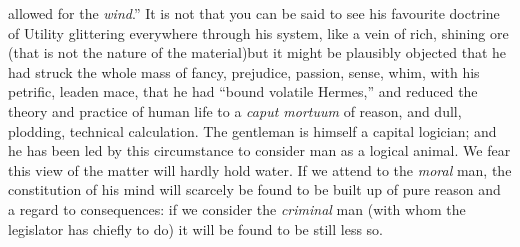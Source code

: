 allowed for the \emph{wind}.'' It is not that you can be said to
see his favourite doctrine of Utility glittering everywhere
through his system, like a vein of rich, shining ore (that is not
the nature of the material)\textemdash but it might be plausibly
objected that he had struck the whole mass of fancy, prejudice,
passion, sense, whim, with his petrific, leaden mace, that he had
``bound volatile Hermes,'' and reduced the theory and practice of
human life to a \emph{caput mortuum} of reason, and dull,
plodding, technical calculation. The gentleman is himself a
capital logician; and he has been led by this circumstance to
consider man as a logical animal. We fear this view of the matter
will hardly hold water.  If we attend to the \emph{moral} man, the
constitution of his mind will scarcely be found to be built up of
pure reason and a regard to consequences: if we consider the
\emph{criminal} man (with whom the legislator has chiefly to do)
it will be found to be still less so.

